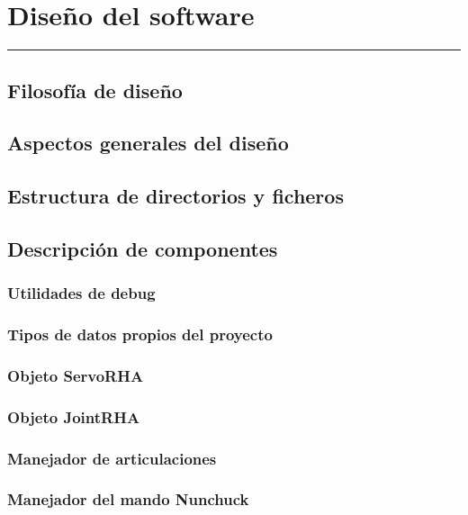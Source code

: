 \chapter{Diseño del software} \label{chap:SW}
\hrule
\vspace{3mm}

\section{Filosofía de diseño} \label{sec:SW:filosofia_diseño}

\section{Aspectos generales del diseño} \label{sec:SW:diseño_general}

\section{Estructura de directorios y ficheros} \label{sec:SW:estructura_dir}

\section{Descripción de componentes} \label{sec:SW:descripcion_componentes}

    \subsection{Utilidades de debug} \label{subsec:SW:debug}
    \subsection{Tipos de datos propios del proyecto} \label{subsec:SW:rhatypes}
    \subsection{Objeto ServoRHA} \label{subsec:SW:servorha}
    \subsection{Objeto JointRHA} \label{subsec:SW:jointrha}
    \subsection{Manejador de articulaciones} \label{subsec:SW:joint_handler}
    \subsection{Manejador del mando Nunchuck} \label{subsec:SW:chuck_handler}

